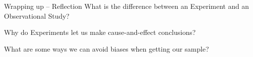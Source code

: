 \documentclass{beamer}
\begin{document}
\begin{frame}{Wrapping up -- Reflection}
    What is the difference between an Experiment and an Observational Study? \vspace{4mm}

    Why do Experiments let us make cause-and-effect conclusions? \vspace{4mm}

    What are some ways we can avoid biases when getting our sample? \vspace{4mm}
\end{frame}
\end{document}
